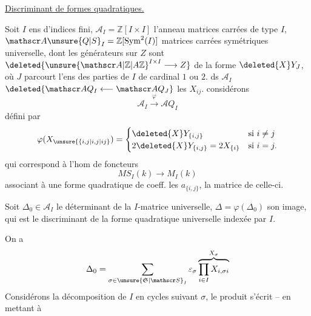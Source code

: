 \uline{Discriminant de formes quadratiques.}

Soit $I$ ens d'indices fini, $\mathscr A_I=\mathbb Z[I\times I]$ l'anneau    matrices carrées de type $I$, $\mathscr A\unsure{Q|S}_I=\mathbb Z[\operatorname{Sym}^2(I)]$   matrices carrées symétriques universelle,  dont les générateurs sur $Z$ sont $\deleted{{\unsure{\mathscr A|\mathbb Z|A\mathbb Z}}^{I\times I}\longrightarrow Z}$ de la forme $\deleted{X}Y_J$, où $J$ parcourt l'ens des parties de $I$ de cardinal $1$ ou $2$.  ds $\mathscr A_I$ $\deleted{\mathscr A Q_I\longleftarrow\mathscr A Q_J}$ les $X_{ij}$.  considérons
\[
\mathscr A_I\xrightarrow{\varphi}\mathscr A Q_I
\]
défini par
\[
\varphi(X_{\unsure{\{i,j|i,j|ij}})=
\begin{cases}
\deleted{X}Y_{\{i,j\}}&\text{si }i\ne j\\
2\deleted{X}Y_{\{i,j\}}=2X_{\{i\}}&\text{si }i=j.
\end{cases}
\]
qui  correspond à l'hom de foncteurs
\[
MS_I(k)\longrightarrow M_I(k)
\]
associant à une forme quadratique de coeff. les $a_{\{i,j\}}$, la matrice de celle-ci.

Soit $\Delta_0\in\mathscr A_I$ le déterminant de la $I$-matrice universelle, $\Delta=\varphi(\Delta_0)$ son image, qui est le discriminant de la forme quadratique universelle indexée par $I$.

On a
\[
\Delta_0=\sum_{\sigma\in\unsure{\mathfrak S|\mathscr S}_I}\varepsilon_\sigma
\overbrace{\prod_{i\in I}X_{i,\sigma i}}^{X_\sigma}
\]
Considérons la décomposition de $I$ en cycles suivant $\sigma$, le produit s'écrit -- en mettant à
